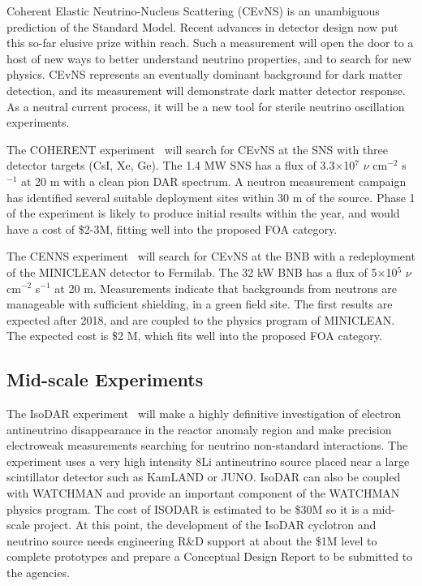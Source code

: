 
\noindent Coherent Elastic Neutrino-Nucleus Scattering (CEvNS) is an
unambiguous prediction of the Standard Model.  Recent advances in
detector design now put this so-far elusive prize within reach. Such a
measurement will open the door to a host of new ways to better
understand neutrino properties, and to search for new physics.  CEvNS
represents an eventually dominant background for dark matter
detection, and its measurement will demonstrate dark matter detector
response.  As a neutral current process, it will be a new tool for
sterile neutrino oscillation experiments.

The COHERENT experiment~\cite{Akimov:2013yow} will search for CEvNS at the
SNS with three detector targets (CsI, Xe, Ge). The 1.4 MW SNS has a
flux of 3.3$\times$10$^{7}$ $\nu$ cm$^{-2}$ s$^{-1}$ at 20 m with a
clean pion DAR spectrum. A neutron measurement campaign has identified
several suitable deployment sites within 30 m of the source. Phase 1
of the experiment is likely to produce initial results within the
year, and would have a cost of \$2-3M, fitting well into the proposed
FOA category.

The CENNS experiment~\cite{Brice:2013fwa} will search for CEvNS at the BNB
with a redeployment of the MINICLEAN detector to Fermilab. The 32 kW
BNB has a flux of 5$\times$10$^{5}$ $\nu$ cm$^{-2}$ s$^{-1}$ at 20
m. Measurements indicate that backgrounds from neutrons are manageable
with sufficient shielding, in a green field site. The first results
are expected after 2018, and are coupled to the physics program of
MINICLEAN. The expected cost is \$2 M, which fits well into the
proposed FOA category.

\subsection{Mid-scale Experiments}


\noindent The IsoDAR experiment~\cite{IsoDAR,IsoDARJuno} will make a
highly definitive investigation of electron antineutrino disappearance
in the reactor anomaly region and make precision electroweak
measurements searching for neutrino non-standard interactions.  The
experiment uses a very high intensity 8Li antineutrino source placed
near a large scintillator detector such as KamLAND or JUNO.  IsoDAR
can also be coupled with WATCHMAN and provide an important component
of the WATCHMAN physics program.  The cost of ISODAR is estimated to
be \$30M so it is a mid-scale project. At this point, the development
of the IsoDAR cyclotron and neutrino source needs engineering R\&D
support at about the \$1M level to complete prototypes and prepare a
Conceptual Design Report to be submitted to the agencies.

